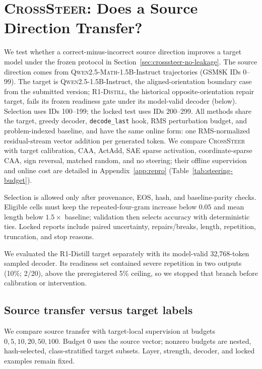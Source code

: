 \section{\textsc{CrossSteer}: Does a Source Direction Transfer?}
\label{sec:crosssteer}

We test whether a correct-minus-incorrect source direction improves a target
model under the frozen protocol in Section~\ref{sec:crosssteer-no-leakage}.
The source direction comes from
\textsc{Qwen2.5-Math}-1.5B-Instruct trajectories (GSM8K IDs 0--99).  The
target is \textsc{Qwen2.5}-1.5B-Instruct, the aligned-orientation boundary
case from the submitted version; \textsc{R1-Distill}, the historical
opposite-orientation repair target, fails its frozen readiness gate under its
model-valid decoder (below).  Selection uses IDs 100--199; the locked test
uses IDs 200--299.  All
methods share the target, greedy decoder, \texttt{decode\_last}
hook, RMS perturbation budget, and problem-indexed baseline, and have the same online form: one RMS-normalized residual-stream vector addition per generated token.  We compare
\textsc{CrossSteer} with target calibration, CAA, ActAdd, SAE sparse activation,
coordinate-sparse CAA, sign reversal, matched random, and no steering; their
offline supervision and online cost are detailed in Appendix~\ref{app:repro} (Table~\ref{tab:steering-budget}).

Selection is allowed only after provenance, EOS, hash, and baseline-parity checks.
Eligible cells must keep the repeated-four-gram increase below $0.05$ and mean
length below $1.5\times$ baseline; validation then selects accuracy with
deterministic ties.  Locked reports include paired uncertainty, repairs/breaks,
length, repetition, truncation, and stop reasons.

We evaluated the R1-Distill target separately with its model-valid 32,768-token sampled
decoder.  Its readiness set contained severe repetition in two outputs
(10\%; 2/20), above the preregistered 5\% ceiling, so we stopped that branch before calibration or intervention.

\subsection{Source transfer versus target labels}

We compare source transfer with target-local supervision at budgets
$0,5,10,20,50,100$.  Budget 0 uses the source vector; nonzero budgets are nested,
hash-selected, class-stratified target subsets.  Layer, strength, decoder, and
locked examples remain fixed.

